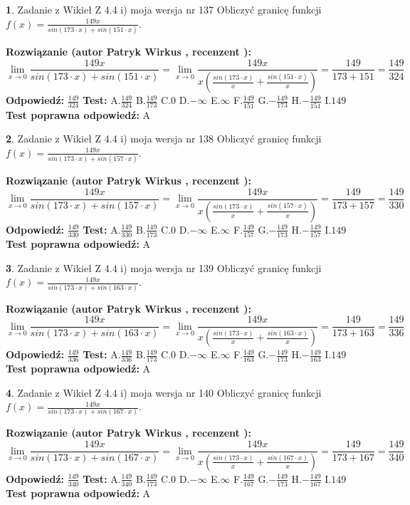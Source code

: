 \documentclass[12pt, a4paper]{article}
\theoremstyle{definition} %
\newtheorem{zad}{}
\newcommand{\zadStart}[1]{\begin{zad}#1\newline}
\newcommand{\zadStop}{\end{zad}}
\newcommand{\rozwStart}[2]{\noindent \textbf{Rozwiązanie (autor #1 , recenzent #2): }\newline}
\newcommand{\rozwStop}{\newline}
\newcommand{\odpStart}{\noindent \textbf{Odpowiedź:}\newline}
\newcommand{\odpStop}{\newline}
\newcommand{\testStart}{\noindent \textbf{Test:}\newline}
\newcommand{\testStop}{\newline}
\newcommand{\kluczStart}{\noindent \textbf{Test poprawna odpowiedź:}\newline}
\newcommand{\kluczStop}{\newline}
\begin{document}
\zadStart{Zadanie z Wikieł Z 4.4 i) moja wersja nr 137}
Obliczyć granicę funkcji $f(x)=\frac{149x}{sin(173\cdot x) +sin(151\cdot x)}$.
\zadStop
\rozwStart{Patryk Wirkus}{}
$$\lim\limits_{x\to 0}\frac{149x}{sin(173\cdot x) +sin(151\cdot x)}=\lim\limits_{x\to 0}\frac{149x}{x(\frac{sin(173\cdot x)}{x}+\frac{sin(151\cdot x)}{x})}=\frac{149}{173+151} = \frac{149}{324}$$
\rozwStop
\odpStart
$\frac{149}{324}$
\odpStop
\testStart
A.$\frac{149}{324}$
B.$\frac{149}{173}$
C.$0$
D.$-\infty$
E.$\infty$
F.$\frac{149}{151}$
G.$-\frac{149}{173}$
H.$-\frac{149}{151}$
I.$149$
\testStop
\kluczStart
A
\kluczStop



\zadStart{Zadanie z Wikieł Z 4.4 i) moja wersja nr 138}
Obliczyć granicę funkcji $f(x)=\frac{149x}{sin(173\cdot x) +sin(157\cdot x)}$.
\zadStop
\rozwStart{Patryk Wirkus}{}
$$\lim\limits_{x\to 0}\frac{149x}{sin(173\cdot x) +sin(157\cdot x)}=\lim\limits_{x\to 0}\frac{149x}{x(\frac{sin(173\cdot x)}{x}+\frac{sin(157\cdot x)}{x})}=\frac{149}{173+157} = \frac{149}{330}$$
\rozwStop
\odpStart
$\frac{149}{330}$
\odpStop
\testStart
A.$\frac{149}{330}$
B.$\frac{149}{173}$
C.$0$
D.$-\infty$
E.$\infty$
F.$\frac{149}{157}$
G.$-\frac{149}{173}$
H.$-\frac{149}{157}$
I.$149$
\testStop
\kluczStart
A
\kluczStop



\zadStart{Zadanie z Wikieł Z 4.4 i) moja wersja nr 139}
Obliczyć granicę funkcji $f(x)=\frac{149x}{sin(173\cdot x) +sin(163\cdot x)}$.
\zadStop
\rozwStart{Patryk Wirkus}{}
$$\lim\limits_{x\to 0}\frac{149x}{sin(173\cdot x) +sin(163\cdot x)}=\lim\limits_{x\to 0}\frac{149x}{x(\frac{sin(173\cdot x)}{x}+\frac{sin(163\cdot x)}{x})}=\frac{149}{173+163} = \frac{149}{336}$$
\rozwStop
\odpStart
$\frac{149}{336}$
\odpStop
\testStart
A.$\frac{149}{336}$
B.$\frac{149}{173}$
C.$0$
D.$-\infty$
E.$\infty$
F.$\frac{149}{163}$
G.$-\frac{149}{173}$
H.$-\frac{149}{163}$
I.$149$
\testStop
\kluczStart
A
\kluczStop



\zadStart{Zadanie z Wikieł Z 4.4 i) moja wersja nr 140}
Obliczyć granicę funkcji $f(x)=\frac{149x}{sin(173\cdot x) +sin(167\cdot x)}$.
\zadStop
\rozwStart{Patryk Wirkus}{}
$$\lim\limits_{x\to 0}\frac{149x}{sin(173\cdot x) +sin(167\cdot x)}=\lim\limits_{x\to 0}\frac{149x}{x(\frac{sin(173\cdot x)}{x}+\frac{sin(167\cdot x)}{x})}=\frac{149}{173+167} = \frac{149}{340}$$
\rozwStop
\odpStart
$\frac{149}{340}$
\odpStop
\testStart
A.$\frac{149}{340}$
B.$\frac{149}{173}$
C.$0$
D.$-\infty$
E.$\infty$
F.$\frac{149}{167}$
G.$-\frac{149}{173}$
H.$-\frac{149}{167}$
I.$149$
\testStop
\kluczStart
A
\kluczStop
\end{document}
